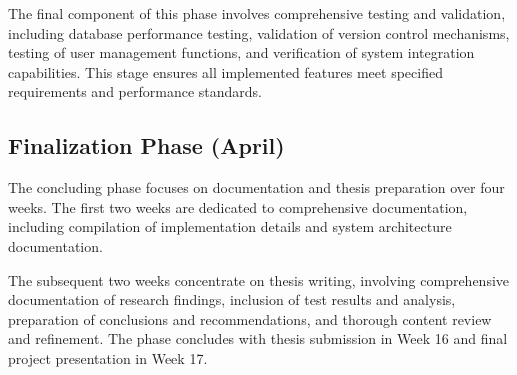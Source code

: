 The final component of this phase involves comprehensive testing and validation, including database performance testing, validation of version control mechanisms, testing of user management functions, and verification of system integration capabilities. This stage ensures all implemented features meet specified requirements and performance standards.

\subsection{Finalization Phase (April)}

The concluding phase focuses on documentation and thesis preparation over four weeks. The first two weeks are dedicated to comprehensive documentation, including compilation of implementation details and system architecture documentation. 

The subsequent two weeks concentrate on thesis writing, involving comprehensive documentation of research findings, inclusion of test results and analysis, preparation of conclusions and recommendations, and thorough content review and refinement. The phase concludes with thesis submission in Week 16 and final project presentation in Week 17.

